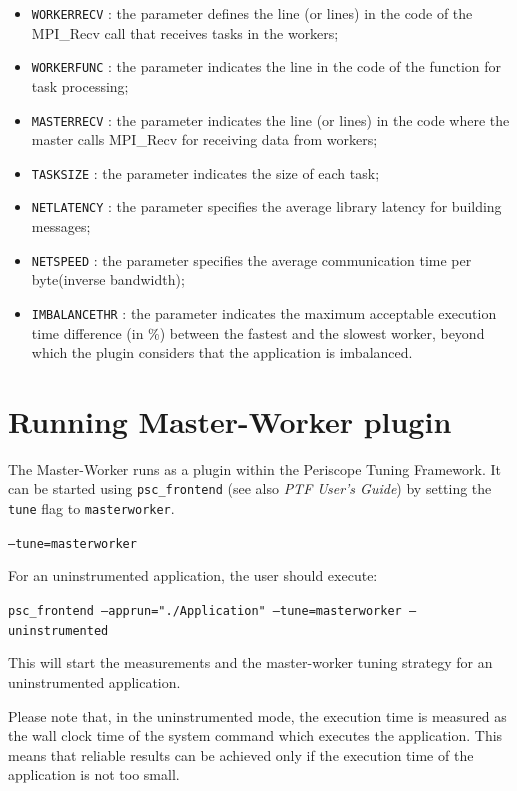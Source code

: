 \documentclass[11pt,a4paper, oneside]{book} %
\begin{document}
\begin{itemize}
\item{\tt WORKERRECV} : the parameter defines the line (or lines) in the code
of the MPI\_Recv call that receives tasks in the workers;
\item{\tt WORKERFUNC} : the parameter indicates the line in the code of the function for task processing;
\item{\tt MASTERRECV} : the parameter indicates the line (or lines) in the code where the master calls MPI\_Recv for receiving data from workers;
\item{\tt TASKSIZE} : the parameter indicates the size of each task;
\item{\tt NETLATENCY} : the parameter specifies the average library latency for building messages;
\item{\tt NETSPEED} : the parameter specifies the average communication time per byte(inverse bandwidth);
\item{\tt IMBALANCETHR} : the parameter indicates the maximum acceptable execution time difference (in \%) between the fastest and the slowest worker, beyond which the plugin considers that the application is imbalanced.

\end{itemize}

\section{Running Master-Worker plugin}
The Master-Worker runs as a plugin within the Periscope Tuning Framework. It can be started using \texttt{psc\_frontend} (see also \textit{PTF User's Guide}) by setting the \texttt{tune} flag to \texttt{masterworker}.
\begin{center}
\texttt{--tune=masterworker}
\end{center}

For an uninstrumented application, the user should execute:
\vspace*{0.5cm}

\texttt{psc\_frontend --apprun="./Application" --tune=masterworker --uninstrumented}

\vspace*{0.5cm}
This will start the measurements and the master-worker tuning strategy for an uninstrumented application.

Please note that, in the uninstrumented mode, the execution time is measured as the wall clock time of the system command which executes the application. This means that reliable results can be achieved only if the execution time of the application is not too small.
\end{document}
